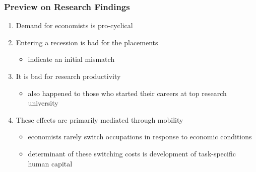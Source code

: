 \documentclass[10pt,svgnames,fragile]{beamer}
\begin{document}
\begin{frame}
	\frametitle{Preview on Research Findings}
	\begin{enumerate}
		\item Demand for economists is pro-cyclical
\vfill
		\item Entering a recession is bad for the placements
		\begin{itemize}
\vspace{1 mm}
		\item indicate an initial mismatch
		\end{itemize}
\vfill
				\item It is bad for research productivity
		\begin{itemize}
\vspace{1 mm}
			\item also happened to those who started their careers at top research university
		\end{itemize}
\vfill
		\item These effects are primarily mediated through mobility			
		\begin{itemize}
			\vspace{1 mm}
			\item economists rarely switch occupations in response to  economic conditions
			\vspace{1 mm}
			\item determinant of these switching costs is development of task-specific human capital
\vfill
		\end{itemize}
	\end{enumerate}
\end{frame}
\end{document}
